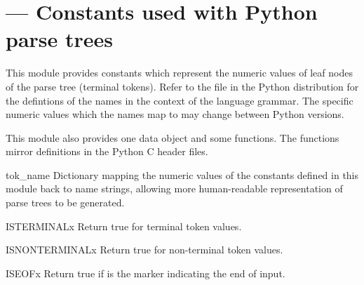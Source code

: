 \section{ ---
         Constants used with Python parse trees}



This module provides constants which represent the numeric values of
leaf nodes of the parse tree (terminal tokens).  Refer to the file
 in the Python distribution for the defintions
of the names in the context of the language grammar.  The specific
numeric values which the names map to may change between Python
versions.

This module also provides one data object and some functions.  The
functions mirror definitions in the Python C header files.



\begin{datadesc}{tok_name}
Dictionary mapping the numeric values of the constants defined in this
module back to name strings, allowing more human-readable
representation of parse trees to be generated.
\end{datadesc}

\begin{funcdesc}{ISTERMINAL}{x}
Return true for terminal token values.
\end{funcdesc}

\begin{funcdesc}{ISNONTERMINAL}{x}
Return true for non-terminal token values.
\end{funcdesc}

\begin{funcdesc}{ISEOF}{x}
Return true if  is the marker indicating the end of input.
\end{funcdesc}

\begin{seealso}
\end{seealso}
